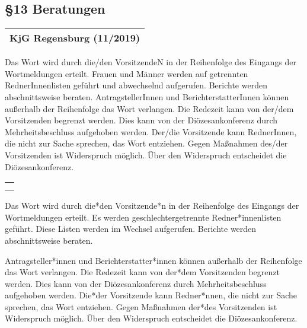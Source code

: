 \documentclass[12pt]{report}
\newcounter{tablecounter}
\newcommand\showcounter{\addtocounter{tablecounter}{1}\thetablecounter}
\begin{document}
\begin{flushleft}
\subsection*{§13 Beratungen}


\begin{table}[H]
 \begin{tabular}{|l|}
  \hline
  \rowcolor[HTML]{FFCC67} 
  \rule[-1ex]{0pt}{4ex} \textbf{KjG Regensburg (11/2019)}     \hspace{0.6\textwidth} \showcounter        \\ \hline
 \end{tabular}
\end{table}

Das Wort wird durch die/den VorsitzendeN in der Reihenfolge des Eingangs der Wortmeldungen erteilt. Frauen
und Männer werden auf getrennten RednerInnenlisten geführt und abwechselnd aufgerufen.
Berichte werden abschnittsweise beraten.
AntragstellerInnen und BerichterstatterInnen können außerhalb der Reihenfolge das Wort verlangen. Die Redezeit
kann von der/dem Vorsitzenden begrenzt werden. Dies kann von der Diözesankonferenz durch Mehrheitsbeschluss
aufgehoben werden. Der/die Vorsitzende kann RednerInnen, die nicht zur Sache sprechen, das
Wort entziehen. Gegen Maßnahmen des/der Vorsitzenden ist Widerspruch möglich. Über den Widerspruch
entscheidet die Diözesankonferenz.

\begin{table}[H]
 \begin{tabular}{|l|}
  \hline
  \rowcolor[HTML]{9AFF99} 
  \rule[-1ex]{0pt}{4ex}
  \begin{minipage}[t]{\textwidth}
   \textbf{Änderung\\}  
    \end{minipage}
  \\ \hline
 \end{tabular}
\end{table}

Das Wort wird durch {\color{red}die*den Vorsitzende*n} in der Reihenfolge des Eingangs der Wortmeldungen erteilt.
{\color{red} Es werden geschlechtergetrennte Redner*innenlisten geführt. Diese Listen werden im Wechsel aufgerufen.}
Berichte werden abschnittsweise beraten.

{\color{red}Antragsteller*innen und Berichterstatter*innen} können außerhalb der Reihenfolge das Wort verlangen. Die Redezeit
kann von {\color{red}der*dem} Vorsitzenden begrenzt werden. Dies kann von der Diözesankonferenz durch Mehrheitsbeschluss
aufgehoben werden. {\color{red}Die*der} Vorsitzende kann {\color{red}Redner*nnen}, die nicht zur Sache sprechen, das
Wort entziehen. Gegen Maßnahmen {\color{red}der*des} Vorsitzenden ist Widerspruch möglich. Über den Widerspruch
entscheidet die Diözesankonferenz.


\end{flushleft}
\end{document}
